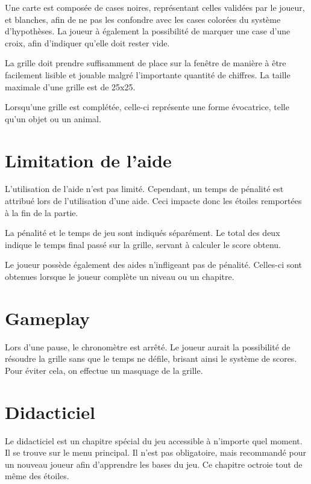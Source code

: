 \documentclass[a4paper, 12pt]{report}
\begin{document}
		Une carte est composée de cases noires, représentant celles validées par le joueur, et blanches, afin de ne pas les confondre avec les cases colorées du système d'hypothèses.
		La joueur à également la possibilité de marquer une case d'une croix, afin d'indiquer qu'elle doit rester vide.
		
		La grille doit prendre suffisamment de place sur la fenêtre de manière à être facilement lisible et jouable malgré l'importante quantité de chiffres. La taille maximale d'une grille est de 25x25.
		
		Lorsqu'une grille est complétée, celle-ci représente une forme évocatrice, telle qu'un objet ou un animal.
	
	\section{Limitation de l'aide}
	
		L'utilisation de l'aide n'est pas limité. Cependant, un temps de pénalité est attribué lors de l'utilisation d'une aide. Ceci impacte donc les étoiles remportées à la fin de la partie. 
		
		La pénalité et le temps de jeu sont indiqués séparément. Le total des deux indique le temps final passé sur la grille, servant à calculer le score obtenu. 
		
		Le joueur possède également des aides n'infligeant pas de pénalité. Celles-ci sont obtenues lorsque le joueur complète un niveau ou un chapitre. 
	
	\section{Gameplay}
	
		Lors d'une pause, le chronomètre est arrêté. Le joueur aurait la possibilité de résoudre la grille sans que le temps ne défile, brisant ainsi le système de scores. 
		Pour éviter cela, on effectue un masquage de la grille.
		
	\section{Didacticiel}
	
		Le didacticiel est un chapitre spécial du jeu accessible à n'importe quel moment. Il se trouve sur le menu principal. 
		Il n'est pas obligatoire, mais recommandé pour un nouveau joueur afin d'apprendre les bases du jeu. Ce chapitre octroie tout de même des étoiles.
		
\end{document}
